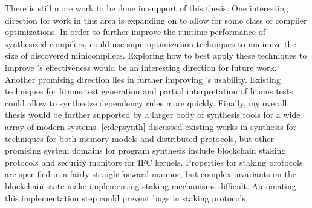 There is still more work to be done in support of this thesis.
One interesting direction for work in this area is expanding on \jitsynth
to allow for some class of compiler optimizations.
In order to further improve the runtime performance of synthesized compilers,
\jitsynth could use superoptimization techniques to minimize the size
of discovered minicompilers.
Exploring how to best apply these techniques to improve \jitsynth's effectiveness
would be an interesting direction for future work.
Another promising direction lies in further improving \depsynth's usability.
Existing techniques for litmus test generation and partial interpretation of litmus tests
could allow \depsynth to synthesize dependency rules more quickly.
Finally, my overall thesis would be further supported by a larger
body of synthesis tools for a wide array of modern systems.
\cref{c:depsynth} discussed existing works in synthesis for
techniques for both memory models and distributed protocols,
but other promising system domains for program synthesis %
include blockchain staking protocols and security monitors for IFC kernels.
Properties for staking protocols are specified in a fairly straightforward mannor,
but complex invariants on the blockchain state make implementing staking mechanisms difficult.
Automating this implementation step could prevent bugs in staking protocols
